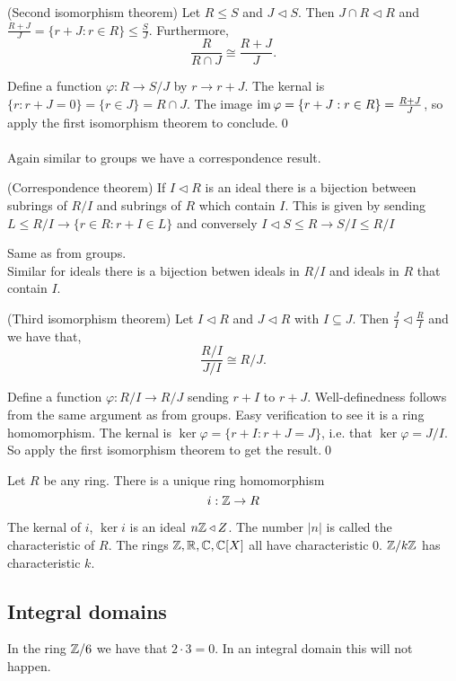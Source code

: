 \documentclass{article}
\newcommand{\nrm}{\triangleleft}
\begin{document}
\begin{itemize}
\begin{theorem}
	(Second isomorphism theorem) Let $ R\le S $ and $ J\nrm S $. Then $ J\cap R\nrm R $ and $ \frac{R+J}{J}=\{r+J:r\in R\}\le \frac SJ $. Furthermore,
	\[
		\frac{R}{R\cap J}\cong \frac{R+J}J.
	\]
\end{theorem}
\pf Define a function $ \varphi:R\to S/J $ by $ r\to r+J $. The kernal is $ \{r:r+J=0\}=\{r\in J\}=R\cap J $. The image $ \operatorname{im}\varphi=\{r+J:r\in R\}=\frac{R+J}J $, so apply the first isomorphism theorem to conclude.\qed
\\\\
Again similar to groups we have a correspondence result.
\begin{theorem}
	(Correspondence theorem) If $ I\nrm R $ is an ideal there is a bijection between subrings of $ R/I $ and subrings of $ R $ which contain $ I $. This is given by sending $ L\le R/I\to \{r\in R: r+I\in L\} $ and conversely $ I\nrm S\le R\to S/I\le R/I $
\end{theorem}
\pf Same as from groups.
\\
Similar for ideals there is a bijection betwen ideals in $ R/I $ and ideals in $ R $ that contain $ I $.
\begin{theorem}
	(Third isomorphism theorem) Let $ I\nrm R $ and $ J\nrm R $ with $ I\subseteq J $. Then $ \frac JI\nrm \frac RI $ and we have that,
	\[
		\frac{R/I}{J/I}\cong R/J.
	\]
\end{theorem}
\pf Define a function $\varphi: R/I\to R/J $ sending $ r+I $ to $ r+J $. Well-definedness follows from the same argument as from groups. Easy verification to see it is a ring homomorphism.
The kernal is $ \ker\varphi=\{r+I:r+J=J\} $, i.e. that $ \ker\varphi=J/I $. So apply the first isomorphism theorem to get the result.\qed
\begin{claim}
  Let $ R $ be any ring. There is a unique ring homomorphism
  \[
	  i:\mathbb{Z}\to R
  \]
\end{claim}
The kernal of $ i $, $ \ker i $ is an ideal $ n\Z\nrm Z $. The number $ |n| $ is called the characteristic of $ R $. The rings $ \mathbb{Z},\mathbb{R},\mathbb{C},\mathbb{C}[X] $ all have characteristic 0. $ \mathbb{Z}/k\mathbb{Z} $ has characteristic $ k $.
\subsection{Integral domains}
In the ring $ \mathbb{Z}/6 $ we have that $ 2\cdot 3 = 0 $. In an integral domain this will not happen.


\end{itemize}
\end{document}
